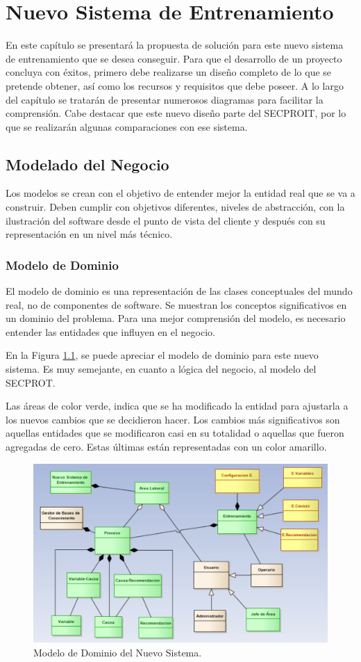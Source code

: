 \chapter{Nuevo Sistema de Entrenamiento}\label{chap:2}
En este capítulo se presentará la propuesta de solución para este nuevo sistema de entrenamiento que se desea conseguir. Para que el desarrollo de un proyecto concluya con éxitos, primero debe realizarse un diseño completo de lo que se pretende obtener, así como los recursos y requisitos que debe poseer. A lo largo del capítulo se tratarán de presentar numerosos diagramas para facilitar la comprensión. Cabe destacar que este nuevo diseño parte del SECPROIT, por lo que se realizarán algunas comparaciones con ese sistema.

\section{Modelado del Negocio}
Los modelos se crean con el objetivo de entender mejor la entidad real que se va a construir. Deben cumplir con objetivos diferentes, niveles de abstracción, con la ilustración del software desde el punto de vista del cliente y después con su representación en un nivel más técnico.

\subsection{Modelo de Dominio}
El modelo de dominio es una representación de las clases conceptuales del mundo real, no de componentes de software. Se muestran los conceptos significativos en un dominio del problema. Para una mejor comprensión del modelo, es necesario entender las entidades que influyen en el negocio.

En la Figura \ref{fig:modelD}, se puede apreciar el modelo de dominio para este nuevo sistema. Es muy semejante, en cuanto a lógica del negocio, al modelo del SECPROT.

Las áreas de color verde, indica que se ha modificado la entidad para ajustarla a los nuevos cambios que se decidieron hacer. Los cambios más significativos son aquellas entidades que se modificaron casi en su totalidad o aquellas que fueron agregadas de cero. Estas últimas están representadas con un color amarillo. 

\begin{figure}[h]
\centering
 \includegraphics[width=0.5\linewidth]{imagen/dominio.png}
 \caption{Modelo de Dominio del Nuevo Sistema.}
 \label{fig:modelD} 
\end{figure} 

